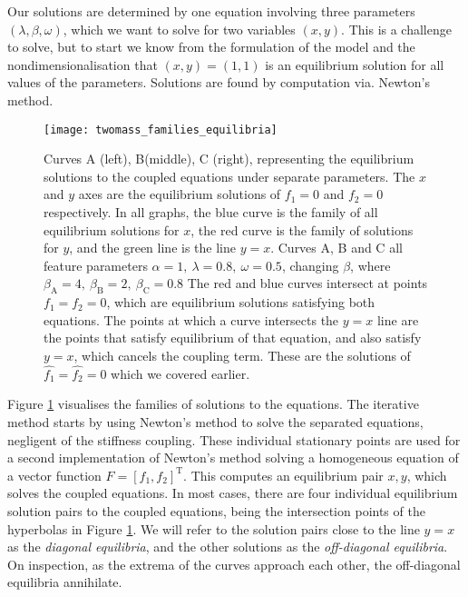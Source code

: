 \documentclass{article}
\begin{document}
Our solutions are determined by one equation involving three parameters \((\lambda, \beta, \omega)\), which we want to solve for two variables \((x,y)\).
This is a challenge to solve, but to start we know from the formulation of the model and the nondimensionalisation that \((x,y) = (1,1)\) is an equilibrium solution for all values of the parameters.
Solutions are found by computation via. Newton's method.
\begin{figure}
    \centering
    \texttt{[image: twomass\_families\_equilibria]}
    \caption{
        Curves A (left), B(middle), C (right), representing the equilibrium solutions to the coupled equations under separate parameters.
        The $x$ and $y$ axes are the equilibrium solutions of $f_1 = 0$ and $f_2=0$ respectively. 
        In all graphs, the blue curve is the family of all equilibrium solutions for $x$,
        the red curve is the family of solutions for $y$,
        and the green line is the line $y=x$.
        Curves A, B and C all feature parameters \(\alpha = 1,~\lambda=0.8,~\omega = 0.5\), changing $\beta$,
        where \(\beta_\mathrm{A} = 4,~\beta_\mathrm{B} = 2,~\beta_\mathrm{C} = 0.8\)
        The red and blue curves intersect at points $f_1=f_2=0$,
        which are equilibrium solutions satisfying both equations.
        The points at which a curve intersects the $y=x$ line are the points that satisfy equilibrium of that equation, and also satisfy $y=x$,
        which cancels the coupling term.
        These are the solutions of $\hat{f_1}=\hat{f_2}=0$ which we covered earlier.
    }
    \label{fig:twomass_equilibrium_curves}
\end{figure}
Figure \ref{fig:twomass_equilibrium_curves} visualises the families of solutions to the equations.
The iterative method starts by using Newton's method to solve the separated equations, negligent of the stiffness coupling.
These individual stationary points are used for a second implementation of Newton's method solving a homogeneous equation of a vector function \(F = [f_1, f_2]^\mathrm{T}\).
This computes an equilibrium pair \(x,y\), which solves the coupled equations. %
In most cases, there are four individual equilibrium solution pairs to the coupled equations,
being the intersection points of the hyperbolas in Figure \ref{fig:twomass_equilibrium_curves}.
We will refer to the solution pairs close to the line $y=x$ as the \textit{diagonal equilibria},
and the other solutions as the \textit{off-diagonal equilibria}.
On inspection, as the extrema of the curves approach each other,
the off-diagonal equilibria annihilate.
\end{document}
